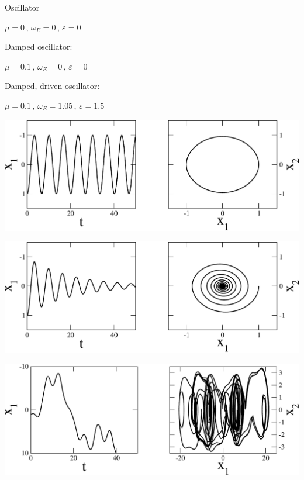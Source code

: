 \begin{frame}[fragile]

 \vspace{2ex}

\begin{minipage}[t]{0.5\textwidth}
\vspace{0pt}
Oscillator

\vspace{1ex}
$\mu=0 \, \text{,} \,\, \omega_E = 0 \, \text{,} \,\, \varepsilon=0$

\vspace{7ex}
Damped oscillator:

\vspace{1ex}
$\mu=0.1  \, \text{,} \,\, \omega_E = 0  \, \text{,} \,\, \varepsilon=0$

\vspace{7ex}
Damped, driven oscillator:

\vspace{1ex}
$\mu=0.1  \, \text{,} \,\, \omega_E = 1.05  \, \text{,} \,\, \varepsilon=1.5$
\end{minipage}\pause
\begin{minipage}[t]{0.49\textwidth}
\vspace{0pt}
\centerline{\includegraphics[draft=false,width=1.0\textwidth]{undamped.pdf}}

\vspace{2.5ex}
\centerline{\includegraphics[draft=false,width=1.0\textwidth]{damped.pdf}}

\vspace{2.5ex}
\centerline{\includegraphics[draft=false,width=1.0\textwidth]{damped_driven.pdf}}
\end{minipage}


\end{frame}
